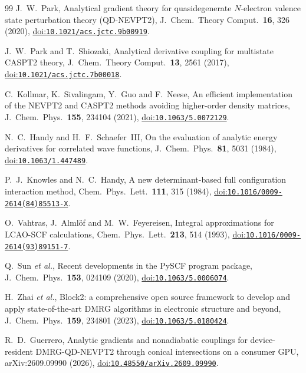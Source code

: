 \documentclass[11pt]{article}
\newcommand{\doi}[1]{\href{https://doi.org/#1}{doi:\nolinkurl{#1}}}
\begin{document}
\begin{thebibliography}{99}
J.~W.~Park, Analytical gradient theory for quasidegenerate $N$-electron
valence state perturbation theory (QD-NEVPT2), J.~Chem.\ Theory Comput.\
\textbf{16}, 326 (2020), \doi{10.1021/acs.jctc.9b00919}.

J.~W.~Park and T.~Shiozaki, Analytical derivative coupling for multistate
CASPT2 theory, J.~Chem.\ Theory Comput.\ \textbf{13}, 2561 (2017),
\doi{10.1021/acs.jctc.7b00018}.

C.~Kollmar, K.~Sivalingam, Y.~Guo and F.~Neese, An efficient implementation
of the NEVPT2 and CASPT2 methods avoiding higher-order density matrices,
J.~Chem.\ Phys.\ \textbf{155}, 234104 (2021), \doi{10.1063/5.0072129}.

N.~C.~Handy and H.~F.~Schaefer~III, On the evaluation of analytic energy
derivatives for correlated wave functions, J.~Chem.\ Phys.\ \textbf{81},
5031 (1984), \doi{10.1063/1.447489}.

P.~J.~Knowles and N.~C.~Handy, A new determinant-based full configuration
interaction method, Chem.\ Phys.\ Lett.\ \textbf{111}, 315 (1984),
\doi{10.1016/0009-2614(84)85513-X}.

O.~Vahtras, J.~Alml{\"o}f and M.~W.~Feyereisen, Integral approximations for
LCAO-SCF calculations, Chem.\ Phys.\ Lett.\ \textbf{213}, 514 (1993),
\doi{10.1016/0009-2614(93)89151-7}.

Q.~Sun \emph{et al.}, Recent developments in the PySCF program package,
J.~Chem.\ Phys.\ \textbf{153}, 024109 (2020), \doi{10.1063/5.0006074}.

H.~Zhai \emph{et al.}, Block2: a comprehensive open source framework to
develop and apply state-of-the-art DMRG algorithms in electronic structure
and beyond, J.~Chem.\ Phys.\ \textbf{159}, 234801 (2023),
\doi{10.1063/5.0180424}.

R.~D.~Guerrero, Analytic gradients and nonadiabatic couplings for
device-resident DMRG-QD-NEVPT2 through conical intersections on a consumer
GPU, arXiv:2609.09990 (2026), \doi{10.48550/arXiv.2609.09990}.

\end{thebibliography}
\end{document}
